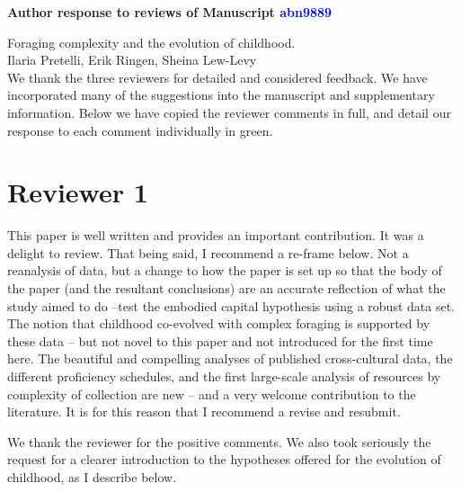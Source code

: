 \documentclass{article}
\newcommand{\rev}[1]{{\color{ForestGreen}#1}}
\begin{document}
\begin{center}
{\Large\bf Author response to reviews of Manuscript \textcolor{blue}{abn9889}}
\end{center}
{\Large Foraging complexity and the evolution of childhood.}\\[1em]
{Ilaria Pretelli, Erik Ringen, Sheina Lew-Levy}\\

We thank the three reviewers for detailed and considered feedback. We have incorporated many of the suggestions into the manuscript and supplementary information. Below we have copied the reviewer comments in full, and detail our \rev{response to each comment individually in green}.

\section{Reviewer 1}
This paper is well written and provides an important contribution. It was a delight to review. That being said, I recommend a re-frame below. Not a reanalysis of data, but a change to how the paper is set up so that the body of the paper (and the resultant conclusions) are an accurate reflection of what the study aimed to do –test the embodied capital hypothesis using a robust data set. The notion that childhood co-evolved with complex foraging is supported by these data – but not novel to this paper and not introduced for the first time here.
The beautiful and compelling analyses of published cross-cultural data, the different proficiency schedules, and the first large-scale analysis of resources by complexity of collection are new – and a very welcome contribution to the literature. It is for this reason that I recommend a revise and resubmit.

\rev{We thank the reviewer for the positive comments. We also took seriously the request for a clearer introduction to the hypotheses offered for the evolution of childhood, as I describe below. }
\end{document}
